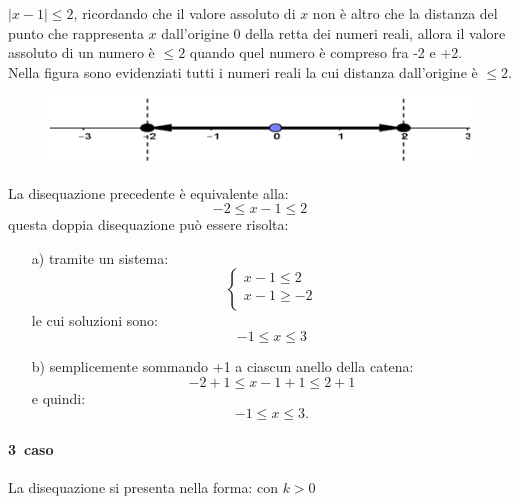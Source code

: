 \begin{esempio}  $|x-1|\leq 2$, ricordando che il valore 
assoluto di $x$ non è altro che la distanza del punto che rappresenta 
$x$ dall'origine 0 della retta dei numeri reali, allora il valore assoluto di 
un 
numero è $\leq 2$ quando quel numero è compreso fra -2 e +2.\\
        Nella figura sono evidenziati tutti i numeri reali la cui distanza 
dall'origine è $\leq 2$.

\begin{figure}[h]
\begin{center}
\begin{inaccessibleblock}[TODO]
\centering
\includegraphics[width=0.5\linewidth]{img/imm4} %
\end{inaccessibleblock}
\label{fig:abs_imm4}
\end{center}
\end{figure}

La disequazione precedente è equivalente alla:
$$-2\leq x-1 \leq 2$$
questa doppia disequazione può essere risolta:
\begin{enumerate}
  \item [a)] tramite un sistema:
    $$
    \left\lbrace 
    \begin{array}{l}
    x-1\leq 2\\
    x-1\geq -2\\
    \end{array}
    \right.
    $$
    le cui soluzioni sono:
    $$-1\leq x \leq 3$$
  \item [b)] semplicemente sommando +1 a ciascun anello della catena:
    $$-2+1\leq x-1+1 \leq 2+1$$
    e quindi:
    $$-1\leq x \leq 3.$$
\end{enumerate}
\end{esempio}

\paragraph{3\textdegree~caso} La disequazione si presenta nella forma:  
 con $k> 0$\\

